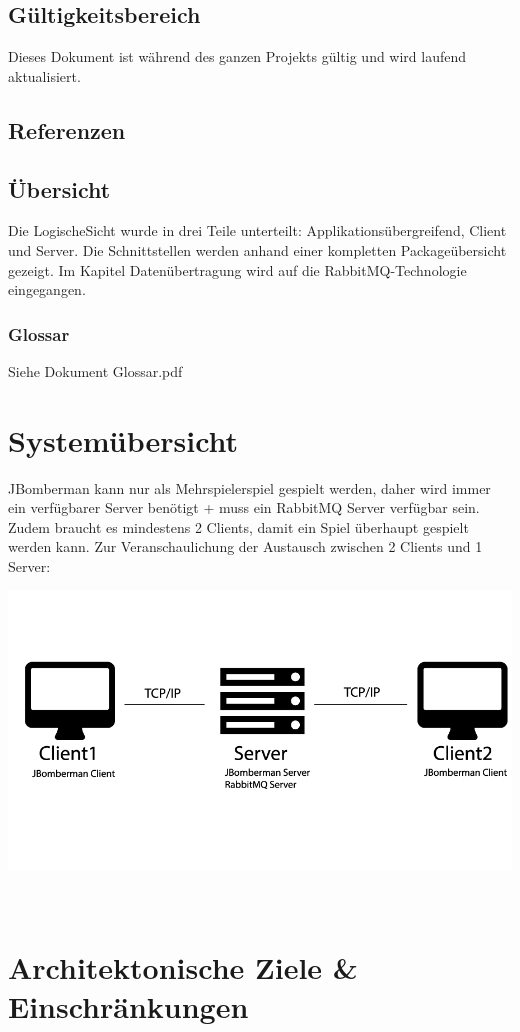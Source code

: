 \documentclass[11pt]{scrartcl}
\begin{document}
\subsection{Gültigkeitsbereich}
Dieses Dokument ist während des ganzen Projekts gültig und wird laufend aktualisiert.
\subsection{Referenzen}
\subsection{Übersicht}
Die LogischeSicht wurde in drei Teile unterteilt: Applikationsübergreifend, Client und Server. Die Schnittstellen werden anhand einer kompletten Packageübersicht gezeigt. Im Kapitel Datenübertragung wird auf die RabbitMQ-Technologie eingegangen. 
\subsubsection{Glossar}
Siehe Dokument Glossar.pdf
 
\section{Systemübersicht}
JBomberman kann nur als Mehrspielerspiel gespielt werden, daher wird immer ein verfügbarer Server benötigt + muss ein RabbitMQ Server verfügbar sein.
Zudem braucht es mindestens 2 Clients, damit ein Spiel überhaupt gespielt werden kann.
Zur Veranschaulichung der Austausch zwischen 2 Clients und 1 Server:

\includegraphics[scale=0.45]{systemuebersicht}
\newpage

 
\section{Architektonische Ziele \& Einschränkungen}
\end{document}
